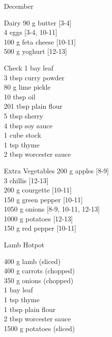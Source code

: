 \begin{menu}{December}
      \begin{shoppinglist}{Dairy}
      90 g butter {\scriptsize[3-4]}\\
      4  eggs {\scriptsize[3-4, 10-11]}\\
      100 g feta cheese {\scriptsize[10-11]}\\
      500 g yoghurt {\scriptsize[12-13]}\\
      \end{shoppinglist}%
      \par\vfil %
      \vfil\clearpage %
      \begin{shoppinglist}{Check}
      1  bay leaf \\
      3 tbsp curry powder \\
      80 g lime pickle \\
      10 tbsp oil \\
      201 tbsp plain flour \\
      5 tbsp sherry \\
      4 tbsp soy sauce \\
      1 cube stock \\
      1 tsp thyme \\
      2 tbsp worcester sauce \\
      \end{shoppinglist}%
      \begin{shoppinglist}{Extra Vegetables}
      200 g apples {\scriptsize[8-9]}\\
      3  chillis {\scriptsize[12-13]}\\
      200 g courgette {\scriptsize[10-11]}\\
      150 g green pepper {\scriptsize[10-11]}\\
      1050 g onions {\scriptsize[8-9, 10-11, 12-13]}\\
      1000 g potatoes {\scriptsize[12-13]}\\
      150 g red pepper {\scriptsize[10-11]}\\
      \end{shoppinglist}%
      \par\vfil %
    \vfil\clearpage
  
    \begin{recipe}{2}{Lamb Hotpot}%
		\begin{ingredients}
		400 g lamb (sliced) \\
	400 g carrots (chopped) \\
	350 g onions (chopped) \\
	1  bay leaf  \\
	1 tsp thyme  \\
	1 tbsp plain flour  \\
	2 tbsp worcester sauce  \\
	1500 g potatoes (sliced) \\
	

\end{ingredients}
\end{recipe}
\end{menu}
